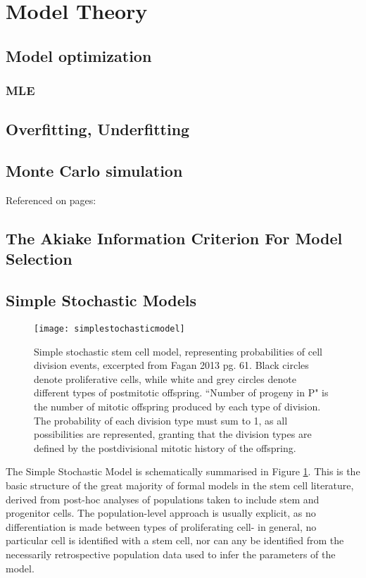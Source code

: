 \section{Model Theory}
\subsection{Model optimization}

\subsubsection{MLE}
\label{MLE}

\subsection{Overfitting, Underfitting}
\label{overfit}

\subsection{Monte Carlo simulation}
Referenced on pages: \pageref{TMSmodel}
\label{MonteCarlo}


\subsection{The Akiake Information Criterion For Model Selection}
 
\subsection{Simple Stochastic Models}
\label{SSM}

\begin{figure}
\texttt{[image: simplestochasticmodel]}
\centering
\caption{Simple stochastic stem cell model, representing probabilities of cell division events, excerpted from Fagan 2013 pg. 61. Black circles denote proliferative cells, while white and grey circles denote different types of postmitotic offspring. ``Number of progeny in P" is the number of mitotic offspring produced by each type of division. The probability of each division type must sum to 1, as all possibilities are represented, granting that the division types are defined by the postdivisional mitotic history of the offspring.}
\label{fig:SSM}
\end{figure}

The Simple Stochastic Model is schematically summarised in Figure \ref{fig:SSM}. This is the basic structure of the great majority of formal models in the stem cell literature, derived from post-hoc analyses of populations taken to include stem and progenitor cells. The population-level approach is usually explicit, as no differentiation is made between types of proliferating cell- in general, no particular cell is identified with a stem cell, nor can any be identified from the necessarily retrospective population data used to infer the parameters of the model. 

